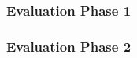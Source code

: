 \subsubsection{Evaluation Phase 1}

\subsubsection{Evaluation Phase 2}


\begin{comment}
The used software components are:
\begin{itemize}
    \item Preprocessing
        \begin{itemize}
            \item PDF extraction: \emph{Cermine\_NlmJat\_extractor}
            \item Metadata extraction and preprocessing:\\ \emph{preprocess-rcc-data}
        \end{itemize}
    \item Dataset Linking
        \begin{itemize}
            \item Find data set mentions: \emph{dataset-mention-extraction}
            \item Predict citations: \emph{dataset-prediction}
        \end{itemize}
    \item Research Field Classification
        \begin{itemize}
            \item Identify research fields: \emph{research-field-detector}
        \end{itemize}
    \item Research Methods Extraction
        \begin{itemize}
            \item Find research methods in a text:\\ \emph{research-method-extractor}
        \end{itemize}

\end{itemize}
\end{comment}


